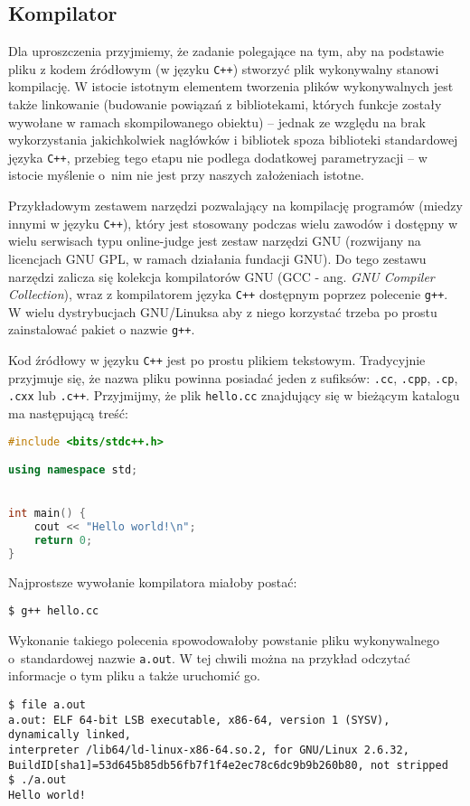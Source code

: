 \subsection{Kompilator}

Dla uproszczenia przyjmiemy, że zadanie polegające na tym, aby na podstawie
pliku z kodem źródłowym (w języku \texttt{C++}) stworzyć plik wykonywalny
stanowi kompilację. W istocie istotnym elementem tworzenia plików wykonywalnych
jest także linkowanie (budowanie powiązań z bibliotekami, których funkcje
zostały wywołane w ramach skompilowanego obiektu) -- jednak ze względu na brak
wykorzystania jakichkolwiek nagłówków i bibliotek spoza biblioteki standardowej
języka \texttt{C++}, przebieg tego etapu nie podlega dodatkowej parametryzacji
-- w istocie myślenie o~nim nie jest przy naszych założeniach istotne.

Przykładowym zestawem narzędzi pozwalający na kompilację programów (miedzy
innymi w języku \texttt{C++}), który jest stosowany podczas wielu zawodów
i dostępny w wielu serwisach typu online-judge jest zestaw narzędzi GNU
(rozwijany na licencjach GNU GPL, w ramach działania fundacji GNU). Do tego
zestawu narzędzi zalicza się kolekcja kompilatorów GNU (GCC - ang. \emph{GNU
Compiler Collection}), wraz z kompilatorem języka \texttt{C++} dostępnym poprzez
polecenie \texttt{g++}. W wielu dystrybucjach GNU/Linuksa aby z niego korzystać
trzeba po prostu zainstalować pakiet o nazwie \texttt{g++}.

Kod źródłowy w języku \texttt{C++} jest po prostu plikiem tekstowym. Tradycyjnie
przyjmuje się, że nazwa pliku powinna posiadać jeden z sufiksów: \texttt{.cc},
\texttt{.cpp}, \texttt{.cp}, \texttt{.cxx} lub \texttt{.c++}. Przyjmijmy, że
plik \texttt{hello.cc} znajdujący się w bieżącym katalogu ma następującą
treść:
\begin{lstlisting}[language=C++, caption={Najprostszy program -- \texttt{hello.cc}.}]
#include <bits/stdc++.h>

using namespace std;


int main() {
	cout << "Hello world!\n";
	return 0;
}
\end{lstlisting}

Najprostsze wywołanie kompilatora miałoby postać:
\begin{Verbatim}[fontsize=\footnotesize]
$ g++ hello.cc
\end{Verbatim}

Wykonanie takiego polecenia spowodowałoby powstanie pliku wykonywalnego
o~standardowej nazwie \texttt{a.out}. W tej chwili można na przykład odczytać
informacje o tym pliku a także uruchomić go.
\begin{Verbatim}[fontsize=\footnotesize]
$ file a.out
a.out: ELF 64-bit LSB executable, x86-64, version 1 (SYSV), dynamically linked,
interpreter /lib64/ld-linux-x86-64.so.2, for GNU/Linux 2.6.32,
BuildID[sha1]=53d645b85db56fb7f1f4e2ec78c6dc9b9b260b80, not stripped
$ ./a.out
Hello world!
\end{Verbatim}

